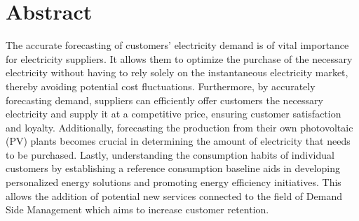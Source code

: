 \chapter*{Abstract} %
\label{abtract}

\vspace{0.4 cm}


The accurate forecasting of customers' electricity demand is of vital importance for electricity suppliers.
It allows them to optimize the purchase of the necessary electricity without having to rely solely on the instantaneous electricity market, thereby avoiding potential cost fluctuations.
Furthermore, by accurately forecasting demand, suppliers can efficiently offer customers the necessary electricity and supply it at a competitive price, ensuring customer satisfaction and loyalty.
Additionally, forecasting the production from their own photovoltaic (PV) plants becomes crucial in determining the amount of electricity that needs to be purchased.
Lastly, understanding the consumption habits of individual customers by establishing a reference consumption baseline aids in developing personalized energy solutions and promoting energy efficiency initiatives.
This allows the addition of potential new services connected to the field of Demand Side Management which aims to increase customer retention.

